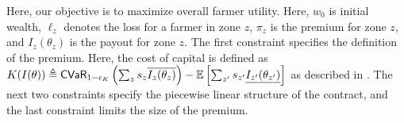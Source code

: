 \documentclass[12pt]{article}
\begin{document}
  Here, our objective is to maximize overall farmer utility. Here, $w_{0}$ is initial wealth, $\ell_z$ denotes the loss for a farmer in zone $z$, $\pi_z$ is the premium for zone $z$, and $I_z(\theta_z)$ is the payout for zone $z$. The first constraint specifies the definition of the premium. Here, the cost of capital is defined as $K(I(\theta)) \triangleq {\sf CVaR}_{1-\epsilon_K} \left ( \sum_z s_z\overline{I_z(\theta_z)} \right ) - \mathbb{E}\left [ \sum_{z'} s_{z'}\underline{I_{z'}(\theta_{z'})} \right ]$ as described in \cite{mapfumo2017risk}. The next two constraints specify the piecewise linear structure of the contract, and the last constraint limits the size of the premium. 


  \newpage
\end{document}
